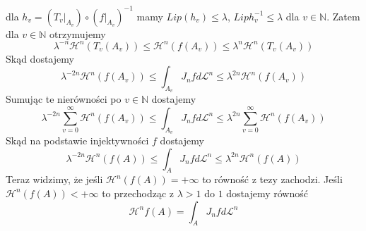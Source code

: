\begin{tw}
	dla $h_v = (T_v|_{A_v}) \circ (f|_{A_v})^{-1}$ mamy $Lip(h_v) \leq \lambda$, $Lip h_v^{-1} \leq \lambda$ dla $v \in \mathbb{N}$. Zatem dla $v \in \mathbb{N}$ otrzymujemy $$
		\lambda^{-n} \mathcal{H}^n(T_v(A_v)) \leq \mathcal{H}^n(f(A_v)) \leq \lambda^n \mathcal{H}^n(T_v(A_v))
	$$
	Skąd dostajemy $$
		\lambda^{-2n}\mathcal{H}^n(f(A_v)) \leq \int_{A_v}J_nf d \mathcal{L}^n \leq \lambda^{2n} \mathcal{H}^n(f(A_v))
	$$
	Sumując te nierówności po $v \in \mathbb{N}$ dostajemy $$
		\lambda^{-2n} \sum_{v=0}^{\infty} \mathcal{H}^n(f(A_v)) \leq \int_{A_v}J_nf d \mathcal{L}^n \leq \lambda^{2n} \sum_{v=0}^{\infty} \mathcal{H}^n(f(A_v))
	$$
	Skąd na podstawie injektywności $f$ dostajemy $$
		\lambda^{-2n}\mathcal{H}^n(f(A)) \leq \int_{A}J_nf d \mathcal{L}^n \leq \lambda^{2n} \mathcal{H}^n(f(A))
	$$
	Teraz widzimy, że jeśli $\mathcal{H}^n(f(A)) = +\infty$ to równość z tezy zachodzi. Jeśli \newline 
	$\mathcal{H}^n(f(A)) < +\infty$ to przechodząc z $\lambda > 1$ do $1$ dostajemy równość $$
		\mathcal{H}^n{f(A)} = \int_A J_nf d\mathcal{L}^n
	$$
\end{tw}